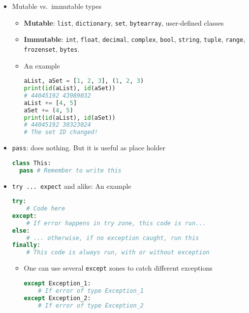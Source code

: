 \documentclass[a4paper,12pt,%
              final%
              ]{article}
\begin{document}
\begin{itemize}
\begin{itemize}
\begin{itemize}
\begin{lstlisting}[language=python]
# That's a {TEST}
\end{lstlisting}
        \end{itemize}
      \item Raw-strings: identified by \texttt{r}, the backslash is interpreted as backslash (automatically escaped). For instance, \verb|'\n'| leads to a newline, \verb|r'\n'| leads to \verb|\n|.
      \item Combine \texttt{f}- and \texttt{r}-strings: just use \verb|fr'...'|
    \end{itemize}
  \item Mutable vs.\ immutable types
    \begin{itemize}
      \item \textbf{Mutable}: \texttt{list}, \texttt{dictionary}, \texttt{set}, \texttt{bytearray}, user-defined classes
      \item \textbf{Immutable}: \texttt{int}, \texttt{float}, \texttt{decimal}, \texttt{complex}, \texttt{bool}, \texttt{string}, \texttt{tuple}, \texttt{range}, \texttt{frozenset}, \texttt{bytes}.
      \item An example
\begin{lstlisting}[language=python]
aList, aSet = [1, 2, 3], (1, 2, 3)
print(id(aList), id(aSet))
# 44045192 43989032
aList += [4, 5]
aSet += (4, 5)
print(id(aList), id(aSet))
# 44045192 30323024
# The set ID changed!
\end{lstlisting}
    \end{itemize}
  \item \verb|pass|: does nothing. But it is useful as place holder
\begin{lstlisting}[language=python]
class This:
  pass # Remember to write this
\end{lstlisting}
  \item \verb|try ... expect| and alike: An example
\begin{lstlisting}[language=python]
try:
    # Code here
except:
    # If error happens in try zone, this code is run...
else:
    # ... otherwise, if no exception caught, run this
finally:
    # This code is always run, with or without exception
\end{lstlisting}
    \begin{itemize}
      \item One can use several \texttt{except} zones to catch different exceptions
\begin{lstlisting}[language=python]
except Exception_1:
    # If error of type Exception_1
except Exception_2:
    # If error of type Exception_2

\end{lstlisting}
\end{itemize}
\end{itemize}
\end{document}
